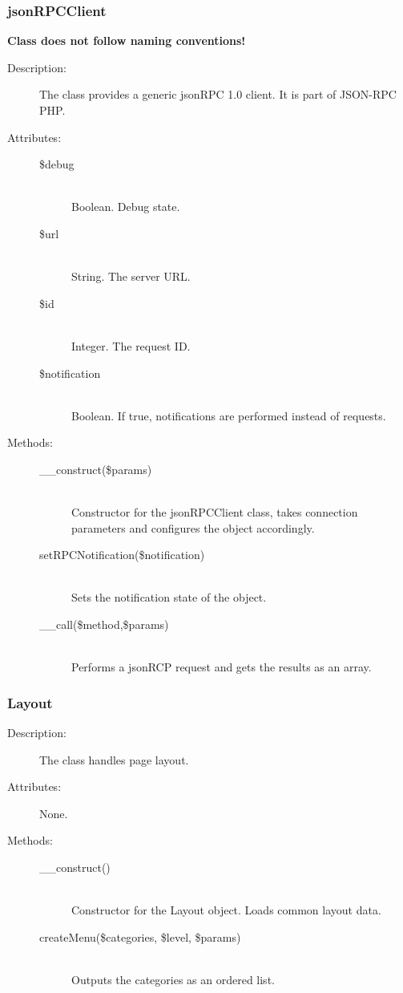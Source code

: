 \documentclass[11pt]{article} %
\begin{document}
\subsubsection{jsonRPCClient}
\textbf{Class does not follow naming conventions!}\\
\begin{description}
\item[Description:] The class provides a generic jsonRPC 1.0 client. It is part of JSON-RPC PHP.
\item[Attributes:] \textbf{ }
\begin{description}
\item[\$debug]  \textbf{ }\\
Boolean. Debug state.
\item[\$url]  \textbf{ }\\
String. The server URL.
\item[\$id]  \textbf{ }\\
Integer. The request ID.
\item[\$notification]  \textbf{ }\\
Boolean. If true, notifications are performed instead of requests.
\end{description}
\item[Methods:] \textbf{ }
\begin{description}
\item[\_\_construct(\$params)]  \textbf{ }\\
Constructor for the jsonRPCClient class, takes connection parameters and configures the object accordingly.
\item[setRPCNotification(\$notification)]  \textbf{ }\\
Sets the notification state of the object.
\item[\_\_call(\$method,\$params)]  \textbf{ }\\
Performs a jsonRCP request and gets the results as an array.
\end{description} 
\end{description} 

\subsubsection{Layout}
\begin{description}
\item[Description:] The class handles page layout.
\item[Attributes:] None.
\item[Methods:] \textbf{ }
\begin{description}
\item[\_\_construct()]  \textbf{ }\\
Constructor for the Layout object. Loads common layout data.
\item[createMenu(\$categories, \$level, \$params)]  \textbf{ }\\
Outputs the categories as an ordered list.
\end{description} 
\end{description} 
\end{document}
